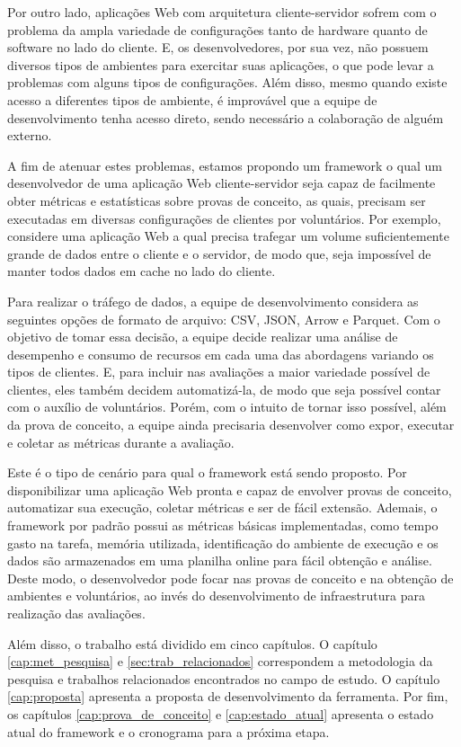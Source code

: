 \documentclass[12pt]{tcc}
\begin{document}
Por outro lado, aplicações Web com arquitetura cliente-servidor sofrem com o problema da ampla variedade de configurações tanto de hardware quanto de software no lado do cliente.
E, os desenvolvedores, por sua vez, não possuem diversos tipos de ambientes para exercitar suas aplicações, o que pode levar a problemas com alguns tipos de configurações.
Além disso, mesmo quando existe acesso a diferentes tipos de ambiente, é improvável que a equipe de desenvolvimento tenha acesso direto, sendo necessário a colaboração de alguém externo.

A fim de atenuar estes problemas, estamos propondo um framework o qual um desenvolvedor de uma aplicação Web cliente-servidor seja capaz de facilmente obter métricas e estatísticas sobre provas de conceito, as quais, precisam ser executadas em diversas configurações de clientes por voluntários.
Por exemplo, considere uma aplicação Web a qual precisa trafegar um volume suficientemente grande de dados entre o cliente e o servidor, de modo que, seja impossível de manter todos dados em cache no lado do cliente.

Para realizar o tráfego de dados, a equipe de desenvolvimento considera as seguintes opções de formato de arquivo: CSV, JSON, Arrow e Parquet.
Com o objetivo de tomar essa decisão, a equipe decide realizar uma análise de desempenho e consumo de recursos em cada uma das abordagens variando os tipos de clientes.
E, para incluir nas avaliações a maior variedade possível de clientes, eles também decidem automatizá-la, de modo que seja possível contar com o auxílio de voluntários.
Porém, com o intuito de tornar isso possível, além da prova de conceito, a equipe ainda precisaria desenvolver como expor, executar e coletar as métricas durante a avaliação.

Este é o tipo de cenário para qual o framework está sendo proposto.
Por disponibilizar uma aplicação Web pronta e capaz de envolver provas de conceito, automatizar sua execução, coletar métricas e ser de fácil extensão.
Ademais, o framework por padrão possui as métricas básicas implementadas, como tempo gasto na tarefa, memória utilizada, identificação do ambiente de execução e os dados são armazenados em uma planilha online para fácil obtenção e análise.
Deste modo, o desenvolvedor pode focar nas provas de conceito e na obtenção de ambientes e voluntários, ao invés do desenvolvimento de infraestrutura para realização das avaliações.

Além disso, o trabalho está dividido em cinco capítulos.
O capítulo \ref{cap:met_pesquisa} e \ref{sec:trab_relacionados} correspondem a metodologia da pesquisa e trabalhos relacionados encontrados no campo de estudo.
O capítulo \ref{cap:proposta} apresenta a proposta de desenvolvimento da ferramenta.
Por fim, os capítulos \ref{cap:prova_de_conceito} e \ref{cap:estado_atual} apresenta o estado atual do framework e o cronograma para a próxima etapa.
\end{document}
